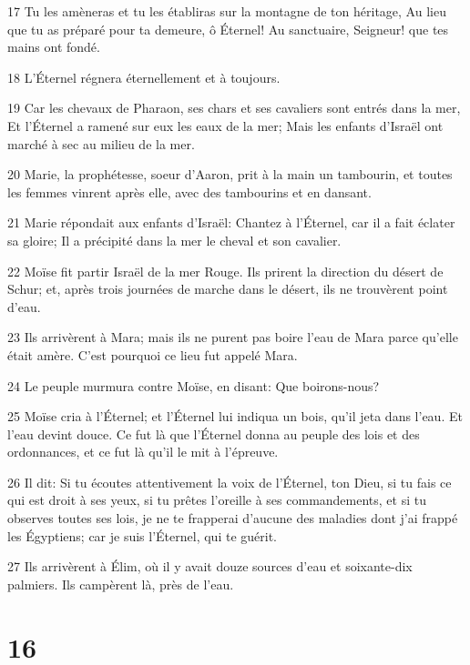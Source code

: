 \par 17 Tu les amèneras et tu les établiras sur la montagne de ton héritage, Au lieu que tu as préparé pour ta demeure, ô Éternel! Au sanctuaire, Seigneur! que tes mains ont fondé.
\par 18 L'Éternel régnera éternellement et à toujours.
\par 19 Car les chevaux de Pharaon, ses chars et ses cavaliers sont entrés dans la mer, Et l'Éternel a ramené sur eux les eaux de la mer; Mais les enfants d'Israël ont marché à sec au milieu de la mer.
\par 20 Marie, la prophétesse, soeur d'Aaron, prit à la main un tambourin, et toutes les femmes vinrent après elle, avec des tambourins et en dansant.
\par 21 Marie répondait aux enfants d'Israël: Chantez à l'Éternel, car il a fait éclater sa gloire; Il a précipité dans la mer le cheval et son cavalier.
\par 22 Moïse fit partir Israël de la mer Rouge. Ils prirent la direction du désert de Schur; et, après trois journées de marche dans le désert, ils ne trouvèrent point d'eau.
\par 23 Ils arrivèrent à Mara; mais ils ne purent pas boire l'eau de Mara parce qu'elle était amère. C'est pourquoi ce lieu fut appelé Mara.
\par 24 Le peuple murmura contre Moïse, en disant: Que boirons-nous?
\par 25 Moïse cria à l'Éternel; et l'Éternel lui indiqua un bois, qu'il jeta dans l'eau. Et l'eau devint douce. Ce fut là que l'Éternel donna au peuple des lois et des ordonnances, et ce fut là qu'il le mit à l'épreuve.
\par 26 Il dit: Si tu écoutes attentivement la voix de l'Éternel, ton Dieu, si tu fais ce qui est droit à ses yeux, si tu prêtes l'oreille à ses commandements, et si tu observes toutes ses lois, je ne te frapperai d'aucune des maladies dont j'ai frappé les Égyptiens; car je suis l'Éternel, qui te guérit.
\par 27 Ils arrivèrent à Élim, où il y avait douze sources d'eau et soixante-dix palmiers. Ils campèrent là, près de l'eau.

\chapter{16}

